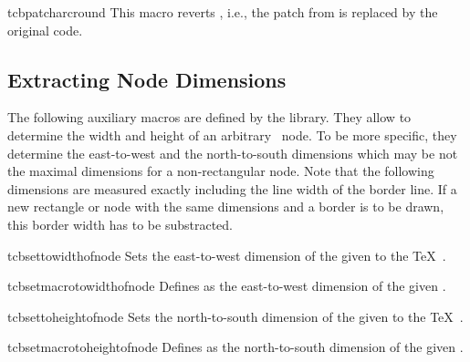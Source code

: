 \begin{docCommand}[doc new=2014-05-05]{tcbpatcharcround}{}
This macro reverts , i.e., the patch from
 is replaced by the original code.
\end{docCommand}


\clearpage
\subsection{Extracting Node Dimensions}
The following auxiliary macros are defined by the  library.
They allow to determine the width and height of an arbitrary \tikzname\ node.
To be more specific, they determine the east-to-west and the north-to-south dimensions
which may be not the maximal dimensions for a non-rectangular node.
Note that the following dimensions are measured exactly including the line width
of the border line. If a new rectangle or node with the same dimensions
and a border is to be drawn, this border width has to be substracted.

\begin{docCommand}[doc new=2014-09-19]{tcbsettowidthofnode}{}
  Sets the east-to-west dimension of the given 
  to the \TeX\ .
\end{docCommand}

\begin{docCommand}[doc new=2014-09-19]{tcbsetmacrotowidthofnode}{}
  Defines  as the east-to-west dimension of the given .
\end{docCommand}

\begin{docCommand}[doc new=2014-09-19]{tcbsettoheightofnode}{}
  Sets the north-to-south dimension of the given 
  to the \TeX\ .
\end{docCommand}

\begin{docCommand}[doc new=2014-09-19]{tcbsetmacrotoheightofnode}{}
  Defines  as the north-to-south dimension of the given .
\end{docCommand}

\begin{dispExample}
\end{dispExample}


